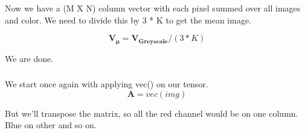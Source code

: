 \documentclass{article}
\newcommand{\matr}[1]{\mathbf{#1}}
\begin{document}
		Now we have a (M X N) column vector with each pixel summed over all images and color. We need to divide this by 3 * K to get the mean
		image.

		\begin{equation*}
		\matr{V_{\mu}} = \matr{V_{Greyscale}} / (3*K) 
		\end{equation*}	

		We are done.

		\subsubsection{} %
	
		We start once again with applying vec() on our tensor.\\

		\begin{equation*}
		\matr{A} = vec(img)
		\end{equation*}
		
		But we'll transpose the matrix, so all the red channel would be on one column. Blue on other and so on. 
		
				
		
\end{document}
